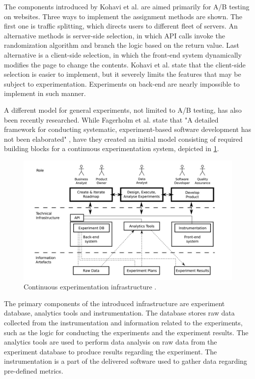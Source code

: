 \documentclass[english]{tktltiki2}
\theoremstyle{definition}
\theoremstyle{remark}
\begin{document}
The components introduced by Kohavi et al. are aimed primarily for A/B testing on websites. Three ways to implement the assignment methods are shown. The first one is traffic splitting, which directs users to different fleet of servers. An alternative methods is server-side selection, in which API calls invoke the randomization algorithm and branch the logic based on the return value. Last alternative is a client-side selection, in which the front-end system dynamically modifies the page to change the contents. Kohavi et al. state that the client-side selection is easier to implement, but it severely limits the features that may be subject to experimentation. Experiments on back-end are nearly impossible to implement in such manner.

A different model for general experiments, not limited to A/B testing, has also been recently researched. While Fagerholm et al. state that "A detailed framework for conducting systematic, experiment-based software development has not been elaborated" \cite{fagerholm2014building}, have they created an initial model consisting of required building blocks for a continuous experimentation system, depicted in \ref{fig4}. 

\begin{figure}[h]
	\centering
	\includegraphics[width=5.0in]{infra.jpg}
	\caption{Continuous experimentation infrastructure \cite{fagerholm2014building}.}
	\label{fig4}
\end{figure}

The primary components of the introduced infrastructure are experiment database, analytics tools and instrumentation. The database stores raw data collected from the instrumentation and information related to the experiments, such as the logic for conducting the experiments and the experiment results. The analytics tools are used to perform data analysis on raw data from the experiment database to produce results regarding the experiment. The instrumentation is a part of the delivered software used to gather data regarding pre-defined metrics.  
\end{document}
